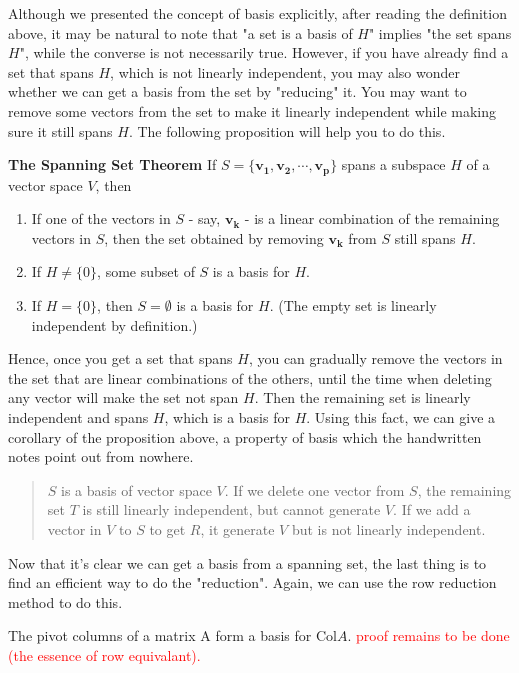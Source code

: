 \documentclass[10pt, a4paper]{article}
\newcommand{\vt}[1]{\mathbf{#1}}
\begin{document}
\indent Although we presented the concept of basis explicitly, after reading the definition above, it may be natural to 
note that "a set is a basis of $H$" implies "the set spans $H$", while the converse is not necessarily true. 
However, if you have already find a set that spans $H$, which is not linearly independent, you may also wonder
whether we can get a basis from the set by "reducing" it. You may want to remove some vectors from the set to make it linearly independent while making sure it still spans $H$. The following proposition will help you to do this.
\begin{proposition}
    \textbf{The Spanning Set Theorem} If $S=\{\mathbf{v_1}, \mathbf{v_2}, \cdots, \mathbf{v_p}\}$ spans a subspace $H$ of a vector space $V$, then 
    \begin{enumerate}
        \item If one of the vectors in $S$ - say, $\vt{v_k}$ - is a linear combination of the remaining vectors in $S$, then the set obtained by removing $\vt{v_k}$ from $S$ still spans $H$.
        \item If $H\neq\{0\}$, some subset of $S$ is a basis for $H$.
        \item If $H=\{0\}$, then $S=\emptyset$ is a basis for $H$. (The empty set is linearly independent by definition.)
    \end{enumerate}
\end{proposition}
\indent Hence, once you get a set that spans $H$, you can gradually remove the vectors in the set that are linear combinations of the others, until the time when deleting any vector will make the set not span $H$. Then the remaining set is linearly independent and spans $H$, which is a basis for $H$. 
Using this fact, we can give a corollary of the proposition above, a property of basis which the handwritten notes point out from nowhere.
\begin{quotation}
    $S$ is a basis of vector space $V$. If we delete one vector from $S$, the remaining set $T$ is still linearly independent, but cannot generate $V$. If we add a vector in $V$ to $S$ to get $R$, it generate $V$ but is not linearly independent.
\end{quotation}
Now that it's clear we can get a basis from a spanning set, the last thing is to find an efficient way to do the "reduction". Again, we can use the row reduction method to do this.
\begin{proposition}
    The pivot columns of a matrix A form a basis for Col$A$. \textcolor{red}{proof remains to be done (the essence of row equivalant).}
\end{proposition}
\end{document}
